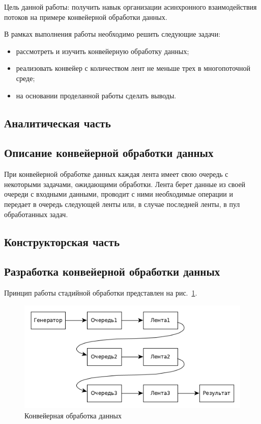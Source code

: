 \documentclass[a4paper,12pt]{article}
\begin{document}
Цель данной работы: получить навык организации асинхронного взаимодействия потоков на примере конвейерной обработки данных.

В рамках выполнения работы необходимо решить следующие задачи:   
		\begin{itemize}
		    \item рассмотреть и изучить конвейерную обработку данных;
			\item реализовать конвейер с количеством лент не меньше трех в многопоточной среде;
			\item на основании проделанной работы сделать выводы.
		\end{itemize}
    \newpage

    \begin{center}
        \section{Аналитическая часть}
	    \subsection{Описание конвейерной обработки данных}
    \end{center}
	
	При конвейерной обработке данных каждая лента имеет свою очередь с некоторыми задачами, ожидающими обработки. Лента берет данные из своей очереди с входными данными, проводит с ними необходимые операции и передает в очередь следующей ленты или, в случае последней ленты, в пул обработанных задач.	
	
    \newpage

    \begin{center}
        \section{Конструкторская часть}
        \subsection{Разработка конвейерной обработки данных}        
    \end{center}
    
	Принцип работы стадийной обработки представлен на рис.~\ref{ris:matr_dl_sh1}.
	\begin{figure}[h]
		 			\centering
		 			{
		 				\includegraphics[scale=0.85]{ris.png}
		 				\captionsetup{labelsep=period}
		 				\caption{Конвейерная обработка данных}
		 				\label{ris:matr_dl_sh1}
		 			}
		 		\end{figure}	
    
\end{document}
